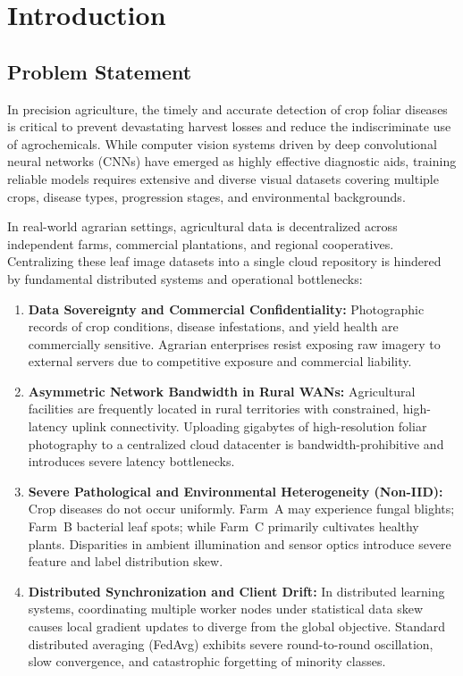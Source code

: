 \documentclass[applsci,article,submit,oneauthor,pdftex]{Definitions/mdpi}
\begin{document}
\section{Introduction}

\subsection{Problem Statement}
In precision agriculture, the timely and accurate detection of crop foliar diseases is critical to prevent devastating harvest losses and reduce the indiscriminate use of agrochemicals. While computer vision systems driven by deep convolutional neural networks (CNNs) have emerged as highly effective diagnostic aids, training reliable models requires extensive and diverse visual datasets covering multiple crops, disease types, progression stages, and environmental backgrounds.

In real-world agrarian settings, agricultural data is decentralized across independent farms, commercial plantations, and regional cooperatives. Centralizing these leaf image datasets into a single cloud repository is hindered by fundamental distributed systems and operational bottlenecks:
\begin{enumerate}[leftmargin=*]
    \item \textbf{Data Sovereignty and Commercial Confidentiality:} Photographic records of crop conditions, disease infestations, and yield health are commercially sensitive. Agrarian enterprises resist exposing raw imagery to external servers due to competitive exposure and commercial liability.
    \item \textbf{Asymmetric Network Bandwidth in Rural WANs:} Agricultural facilities are frequently located in rural territories with constrained, high-latency uplink connectivity. Uploading gigabytes of high-resolution foliar photography to a centralized cloud datacenter is bandwidth-prohibitive and introduces severe latency bottlenecks.
    \item \textbf{Severe Pathological and Environmental Heterogeneity (Non-IID):} Crop diseases do not occur uniformly. Farm~A may experience fungal blights; Farm~B bacterial leaf spots; while Farm~C primarily cultivates healthy plants. Disparities in ambient illumination and sensor optics introduce severe feature and label distribution skew.
    \item \textbf{Distributed Synchronization and Client Drift:} In distributed learning systems, coordinating multiple worker nodes under statistical data skew causes local gradient updates to diverge from the global objective. Standard distributed averaging (FedAvg) exhibits severe round-to-round oscillation, slow convergence, and catastrophic forgetting of minority classes.
\end{enumerate}
\end{document}
